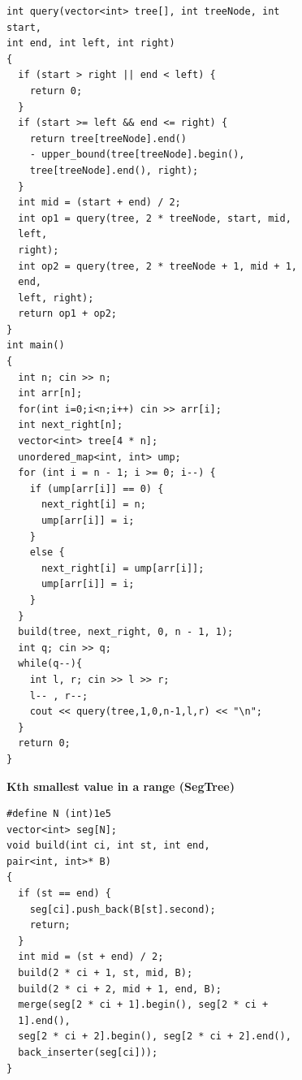 \switchcolumn

\begin{lstlisting}
int query(vector<int> tree[], int treeNode, int
start,
int end, int left, int right)
{
  if (start > right || end < left) {
    return 0;
  }
  if (start >= left && end <= right) {
    return tree[treeNode].end()
    - upper_bound(tree[treeNode].begin(),
    tree[treeNode].end(), right);
  }
  int mid = (start + end) / 2;
  int op1 = query(tree, 2 * treeNode, start, mid,
  left,
  right);
  int op2 = query(tree, 2 * treeNode + 1, mid + 1,
  end,
  left, right);
  return op1 + op2;
}
int main()
{
  int n; cin >> n;
  int arr[n];
  for(int i=0;i<n;i++) cin >> arr[i];
  int next_right[n];
  vector<int> tree[4 * n];
  unordered_map<int, int> ump;
  for (int i = n - 1; i >= 0; i--) {
    if (ump[arr[i]] == 0) {
      next_right[i] = n;
      ump[arr[i]] = i;
    }
    else {
      next_right[i] = ump[arr[i]];
      ump[arr[i]] = i;
    }
  }
  build(tree, next_right, 0, n - 1, 1);
  int q; cin >> q;
  while(q--){
    int l, r; cin >> l >> r;
    l-- , r--;
    cout << query(tree,1,0,n-1,l,r) << "\n";
  }
  return 0;
}
\end{lstlisting}

\textbf{Kth smallest value in a range (SegTree)}
\begin{lstlisting}
#define N (int)1e5
vector<int> seg[N];
void build(int ci, int st, int end,
pair<int, int>* B)
{
  if (st == end) {
    seg[ci].push_back(B[st].second);
    return;
  }
  int mid = (st + end) / 2;
  build(2 * ci + 1, st, mid, B);
  build(2 * ci + 2, mid + 1, end, B);
  merge(seg[2 * ci + 1].begin(), seg[2 * ci +
  1].end(),
  seg[2 * ci + 2].begin(), seg[2 * ci + 2].end(),
  back_inserter(seg[ci]));
}
\end{lstlisting}

\switchcolumn

